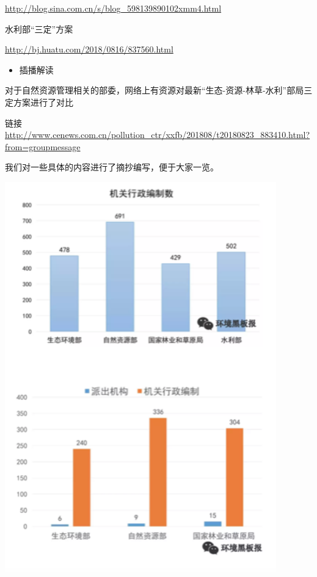 \documentclass[]{book}
\providecommand{\tightlist}{%
  \setlength{\itemsep}{0pt}\setlength{\parskip}{0pt}}
\begin{document}
\url{http://blog.sina.com.cn/s/blog_598139890102xmm4.html}

水利部``三定''方案

\url{http://bj.huatu.com/2018/0816/837560.html}

\begin{itemize}
\tightlist
\item
  插播解读
\end{itemize}

对于自然资源管理相关的部委，网络上有资源对最新``生态-资源-林草-水利''部局三定方案进行了对比

链接 \url{http://www.cenews.com.cn/pollution_ctr/xxfb/201808/t20180823_883410.html?from=groupmessage}

我们对一些具体的内容进行了摘抄编写，便于大家一览。

\includegraphics[width=4.62in]{images/zc1}
\end{document}
